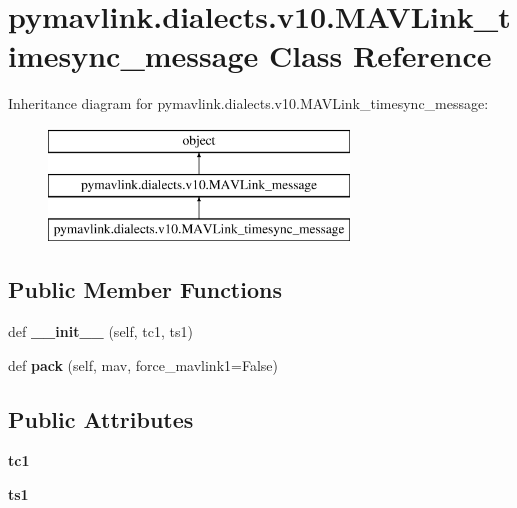 \hypertarget{classpymavlink_1_1dialects_1_1v10_1_1MAVLink__timesync__message}{}\section{pymavlink.\+dialects.\+v10.\+M\+A\+V\+Link\+\_\+timesync\+\_\+message Class Reference}
\label{classpymavlink_1_1dialects_1_1v10_1_1MAVLink__timesync__message}
Inheritance diagram for pymavlink.\+dialects.\+v10.\+M\+A\+V\+Link\+\_\+timesync\+\_\+message\+:\begin{figure}[H]
\begin{center}
\leavevmode
\includegraphics[height=3.000000cm]{classpymavlink_1_1dialects_1_1v10_1_1MAVLink__timesync__message}
\end{center}
\end{figure}
\subsection*{Public Member Functions}
\begin{DoxyCompactItemize}
\item 
\mbox{\label{classpymavlink_1_1dialects_1_1v10_1_1MAVLink__timesync__message_a56c33cb1762bc186da10d912e79b2d16}} 
def {\bfseries \+\_\+\+\_\+init\+\_\+\+\_\+} (self, tc1, ts1)
\item 
\mbox{\label{classpymavlink_1_1dialects_1_1v10_1_1MAVLink__timesync__message_a0d949ac71e8817a528a83dcbe5b54e78}} 
def {\bfseries pack} (self, mav, force\+\_\+mavlink1=False)
\end{DoxyCompactItemize}
\subsection*{Public Attributes}
\begin{DoxyCompactItemize}
\item 
\mbox{\label{classpymavlink_1_1dialects_1_1v10_1_1MAVLink__timesync__message_a1b0738766e4a3a719bc30eed7f53bff4}} 
{\bfseries tc1}
\item 
\mbox{\label{classpymavlink_1_1dialects_1_1v10_1_1MAVLink__timesync__message_a487671dc29e7b5c6b8fee0a492d7626a}} 
{\bfseries ts1}
\end{DoxyCompactItemize}
